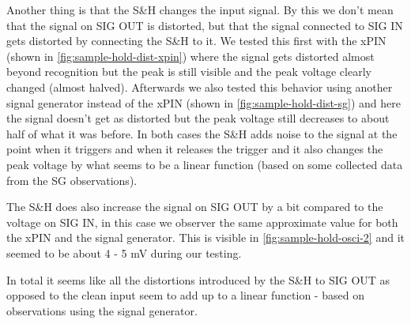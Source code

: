 \documentclass[a4paper, 10pt]{article}
\begin{document}
Another thing is that the S\&H changes the input signal.
By this we don't mean that the signal on SIG OUT is distorted, but that the signal connected to SIG IN gets distorted by connecting the S\&H to it.
We tested this first with the xPIN (shown in \cref{fig:sample-hold-dist-xpin}) where the signal gets distorted almost beyond recognition but the peak is still visible and the peak voltage clearly changed (almost halved).
Afterwards we also tested this behavior using another signal generator instead of the xPIN (shown in \cref{fig:sample-hold-dist-sg}) and here the signal doesn't get as distorted but the peak voltage still decreases to about half of what it was before.
In both cases the S\&H adds noise to the signal at the point when it triggers and when it releases the trigger and it also changes the peak voltage by what seems to be a linear function (based on some collected data from the SG observations).

The S\&H does also increase the signal on SIG OUT by a bit compared to the voltage on SIG IN, in this case we observer the same approximate value for both the xPIN and the signal generator.
This is visible in \cref{fig:sample-hold-osci-2} and it seemed to be about 4 - 5 \si{\milli\volt} during our testing.

In total it seems like all the distortions introduced by the S\&H to SIG OUT as opposed to the clean input seem to add up to a linear function - based on observations using the signal generator.
\end{document}
